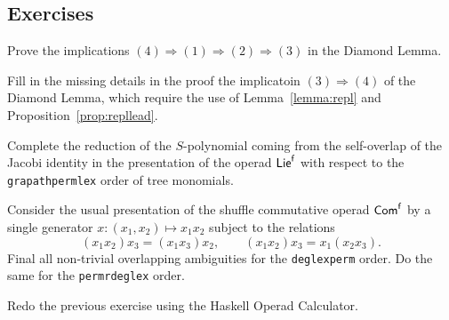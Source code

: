 \subsection{Exercises}

\begin{question}\label{ex:DiamondLemma}
Prove the implications $(4)\Longrightarrow (1) \Longrightarrow
(2)\Longrightarrow (3)$ in the Diamond Lemma.
\end{question}

\begin{question}\label{ex:fillin}
Fill in the missing details in the proof the implicatoin
$(3)\Longrightarrow (4)$ of the Diamond Lemma, which require
the use of Lemma~\ref{lemma:repl}
and Proposition~\ref{prop:repllead}. 
\end{question}

\begin{question}\label{ex:SpolyLie}
Complete the reduction of the $S$-polynomial coming from the
self-overlap of the Jacobi identity in the presentation of
the operad $\mathsf{Lie}^{\mathsf{f}}$ with respect to the 
\texttt{grapathpermlex} order of tree monomials.
\end{question}

\begin{question} Consider the usual
presentation of the shuffle commutative operad
$\mathsf{Com}^{\mathsf{f}}$ by a single generator $x:(x_1,x_2)\longmapsto x_1x_2$
subject to the relations
\[
(x_1x_2)x_3 = (x_1x_3)x_2, \qquad
(x_1x_2)x_3 = x_1(x_2x_3).
\]
Final all non-trivial overlapping 
ambiguities for the \texttt{deglexperm}
order. Do the same 
for the \texttt{permrdeglex}
order.
\end{question}

\begin{question} 
Redo the previous exercise using the Haskell Operad Calculator.
\end{question}

